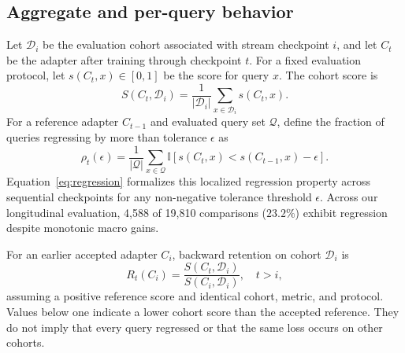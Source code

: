 \documentclass[conference]{IEEEtran}
\begin{document}
\subsection{Aggregate and per-query behavior}
Let $\mathcal{D}_i$ be the evaluation cohort associated with stream checkpoint $i$, and let $C_t$ be the adapter after training through checkpoint $t$. For a fixed evaluation protocol, let $s(C_t,x)\in[0,1]$ be the score for query $x$. The cohort score is
\begin{equation}
S(C_t,\mathcal{D}_i)=\frac{1}{|\mathcal{D}_i|}\sum_{x\in\mathcal{D}_i}s(C_t,x).
\label{eq:cohort}
\end{equation}
For a reference adapter $C_{t-1}$ and evaluated query set $\mathcal{Q}$, define the fraction of queries regressing by more than tolerance $\epsilon$ as
\begin{equation}
\rho_t(\epsilon)=\frac{1}{|\mathcal{Q}|}\sum_{x\in\mathcal{Q}}\mathbb{I}[s(C_t,x)<s(C_{t-1},x)-\epsilon].
\label{eq:regression}
\end{equation}
Equation~\ref{eq:regression} formalizes this localized regression property across sequential checkpoints for any non-negative tolerance threshold $\epsilon$. Across our longitudinal evaluation, 4,588 of 19,810 comparisons ($23.2\%$) exhibit regression despite monotonic macro gains.

For an earlier accepted adapter $C_i$, backward retention on cohort $\mathcal{D}_i$ is
\begin{equation}
R_t(C_i)=\frac{S(C_t,\mathcal{D}_i)}{S(C_i,\mathcal{D}_i)},\quad t>i,
\label{eq:retention}
\end{equation}
assuming a positive reference score and identical cohort, metric, and protocol. Values below one indicate a lower cohort score than the accepted reference. They do not imply that every query regressed or that the same loss occurs on other cohorts.
\end{document}
